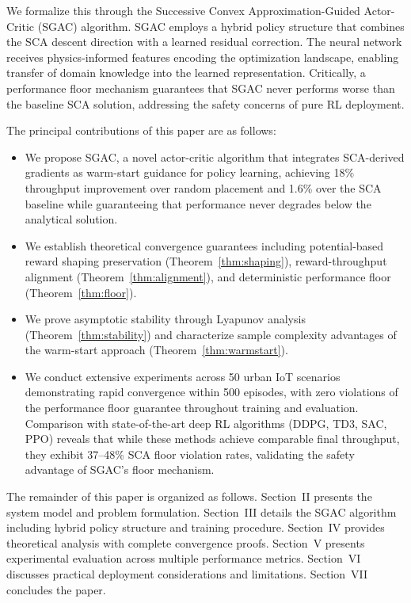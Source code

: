 \documentclass[journal]{IEEEtran}
\begin{document}
We formalize this through the Successive Convex Approximation-Guided Actor-Critic (SGAC) algorithm. SGAC employs a hybrid policy structure that combines the SCA descent direction with a learned residual correction. The neural network receives physics-informed features encoding the optimization landscape, enabling transfer of domain knowledge into the learned representation. Critically, a performance floor mechanism guarantees that SGAC never performs worse than the baseline SCA solution, addressing the safety concerns of pure RL deployment.

The principal contributions of this paper are as follows:
\begin{itemize}
\item We propose SGAC, a novel actor-critic algorithm that integrates SCA-derived gradients as warm-start guidance for policy learning, achieving 18\% throughput improvement over random placement and 1.6\% over the SCA baseline while guaranteeing that performance never degrades below the analytical solution.
\item We establish theoretical convergence guarantees including potential-based reward shaping preservation (Theorem~\ref{thm:shaping}), reward-throughput alignment (Theorem~\ref{thm:alignment}), and deterministic performance floor (Theorem~\ref{thm:floor}).
\item We prove asymptotic stability through Lyapunov analysis (Theorem~\ref{thm:stability}) and characterize sample complexity advantages of the warm-start approach (Theorem~\ref{thm:warmstart}).
\item We conduct extensive experiments across 50 urban IoT scenarios demonstrating rapid convergence within 500 episodes, with zero violations of the performance floor guarantee throughout training and evaluation. Comparison with state-of-the-art deep RL algorithms (DDPG, TD3, SAC, PPO) reveals that while these methods achieve comparable final throughput, they exhibit 37--48\% SCA floor violation rates, validating the safety advantage of SGAC's floor mechanism.
\end{itemize}

The remainder of this paper is organized as follows. Section~II presents the system model and problem formulation. Section~III details the SGAC algorithm including hybrid policy structure and training procedure. Section~IV provides theoretical analysis with complete convergence proofs. Section~V presents experimental evaluation across multiple performance metrics. Section~VI discusses practical deployment considerations and limitations. Section~VII concludes the paper.
\end{document}
